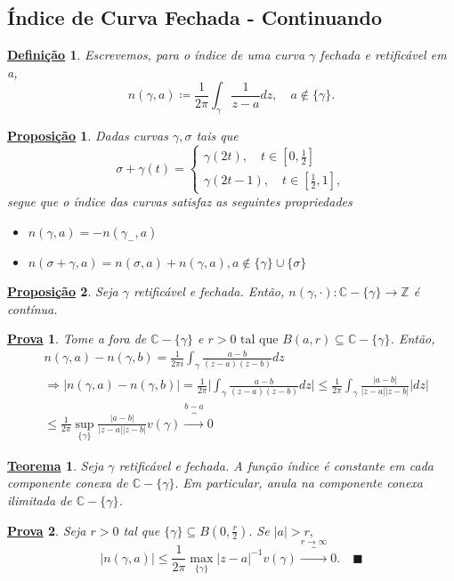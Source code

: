 \documentclass{article}
\newtheorem*{def*}{\underline{Defini\c c\~ao}}
\newtheorem*{theorem*}{\underline{Teorema}}
\newtheorem*{proof*}{\underline{Prova}}
\newtheorem*{prop*}{\underline{Proposi\c c\~ao}}
\renewcommand\qedsymbol{$\blacksquare$}
\begin{document}
  \subsection{\'Indice de Curva Fechada - Continuando}
  \begin{def*}
    Escrevemos, para o \'indice de uma curva $\gamma$ fechada e retific\'avel em a, 
    $$
    n(\gamma, a)\coloneqq  \frac{1}{2\pi}\int_{\gamma}^{}\frac{1}{z-a}dz, \quad a\not\in \{\gamma\}.
    $$
  \end{def*}
  \begin{prop*}
    Dadas curvas $\gamma, \sigma$ tais que 
    $$
    \sigma + \gamma(t)  = \left\{\begin{array}{ll}
        \gamma(2t), \quad t\in[0, \frac{1}{2}] \\
        \gamma(2t-1), \quad t\in[\frac{1}{2}, 1],
    \end{array}\right.
    $$
    segue que o \'indice das curvas satisfaz as seguintes propriedades
    \begin{itemize}
      \item[i)] $n(\gamma, a) = -n(\gamma_{-}, a)$
      \item[ii)] $n(\sigma+\gamma, a) = n(\sigma, a) + n(\gamma, a), a\not\in \{\gamma\}\cup \{\sigma\}$
    \end{itemize}
  \end{prop*}
  \begin{prop*}
    Seja $\gamma$ retific\'avel e fechada. Ent\~ao, $n(\gamma, \cdot):\mathbb{C}-\{\gamma\} \rightarrow \mathbb{Z}$ \'e cont\'inua.
  \end{prop*}
  \begin{proof*}
    Tome a fora de $\mathbb{C}-\{\gamma\}$ e $r > 0\text{ tal que } B(a, r)\subseteq{\mathbb{C}-\{\gamma\}}$. Ent\~ao, 
    \begin{align*}
  &n(\gamma, a) - n(\gamma, b) = \frac{1}{2\pi i}\int_{\gamma}^{}\frac{a - b}{(z-a)(z-b)}dz\\
  &\Rightarrow|n(\gamma, a) - n(\gamma, b)| = \frac{1}{2\pi}\biggl|\int_{\gamma}^{}\frac{a-b}{(z-a)(z-b)}dz\biggr|\leq \frac{1}{2\pi}\int_{\gamma}^{}\frac{|a-b|}{|z-a||z-b|}|dz|\\
  &\leq\frac{1}{2\pi}\sup_{\{\gamma\} }\frac{|a-b|}{|z-a||z-b|}v(\gamma)\overbrace{\to}^{b-a}0
    \end{align*}
  \end{proof*}
  \begin{theorem*}
    Seja $\gamma$ retific\'avel e fechada. A fun\c c\~ao \'indice \'e constante em cada componente conexa de $\mathbb{C}-\{\gamma\}.$
    Em particular, anula na componente conexa ilimitada de $\mathbb{C}-\{\gamma\} $.
  \end{theorem*}
  \begin{proof*}
    Seja $r > 0$ tal que $\{\gamma\}\subseteq{B(0, \frac{r}{2})}.$ Se $|a| > r,$
    $$
    |n(\gamma, a)|\leq \frac{1}{2\pi}\max_{\{\gamma\}}|z-a|^{-1}v(\gamma)\overbrace{\to}^{r\to\infty}0. \quad\text{\qedsymbol}
    $$
  \end{proof*}
\end{document}
